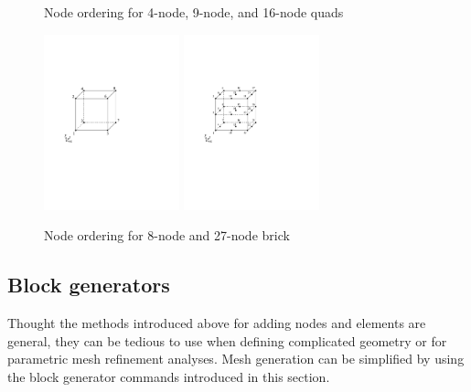 \begin{figure}[htbp]
\begin{minipage}{\linewidth}
\caption{Node ordering for 4-node, 9-node, and 16-node quads}
\label{fig:NodeOrderingQuad}
\end{minipage}
\centering
\includegraphics[trim=1.2in 4.2in 3.5in 3.0in, clip, height=2in]{fig/nodeordering3D_8.pdf}
\includegraphics[trim=1.2in 4.2in 3.5in 3.0in, clip, height=2in]{fig/nodeordering3D_27.pdf}
\caption{Node ordering for 8-node and 27-node brick}
\label{fig:NodeOrderingBrick}
\end{figure}

\clearpage
\subsection{Block generators}
\label{section:BlockGenerators}
Thought the methods introduced above for adding nodes and 
elements are general, they can be tedious to use when defining
complicated geometry or for parametric mesh refinement analyses.
Mesh generation can be simplified by using the block generator
commands introduced in this section.

